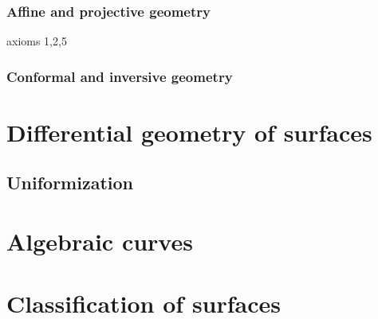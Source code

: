 \documentclass{../../large}
\begin{document}
\section{Affine and projective geometry}
axioms 1,2,5
\section{Conformal and inversive geometry}


\part{Differential geometry of surfaces}
\chapter{}
\iffalse
\section{Symmetry groups}
isometry, conformal, rigid motion, etc.
\section{Discrete subgroups}
continuous group actions?
(convex, locally finite) fundamental domains
tesselation, polygon theorem
Fuchsian and Kleinian
\fi

\chapter{Uniformization}

\part{Algebraic curves}

\part{Classification of surfaces}
\end{document}
